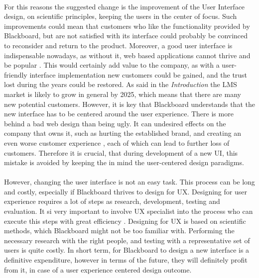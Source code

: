 \documentclass[]{article}
\begin{document}
\paragraph{}
For this reasons the suggested change is the improvement of the User Interface design, on scientific principles, keeping the users in the center of focus. Such improvements could mean that customers who like the functionality provided by Blackboard, but are not satisfied with its interface could probably be convinced to reconsider and return to the product. Moreover, a good user interface is indispensable nowadays, as without it, web based applications cannot thrive and be popular \cite{UI-Advantages}. This would certainly add value to the company, as with a user-friendly interface implementation new customers could be gained, and the trust lost during the years could be restored. As said in the \textit{Introduction} the LMS market is likely to grow in general by 2025, which means that there are many new potential customers. However, it is key that Blackboard understands that the new interface has to be centered around the user experience. There is more behind a bad web design than being ugly. It can undesired effects on the company that owns it, such as hurting the established brand, and creating an even worse customer experience \cite{bad-design-why}, each of which can lead to further loss of customers. Therefore it is crucial, that during development of a new UI, this mistake is avoided by keeping the in mind the user-centered design paradigms. 


\paragraph{}
However, changing the user interface is not an easy task. This process can be long and costly, especially if Blackboard thrives to design for UX. Designing for user experience requires a lot of steps as research, development, testing and evaluation. It si very important to involve UX specialist into the process who can execute this steps with great efficiency \cite{UX-30000}. Designing for UX is based on scientific methods, which Blackboard might not be too familiar with. Performing the necessary research with the right people, and testing with a representative set of users is quite costly. In short term, for Blackboard to design a new interface is a definitive expenditure, however in terms of the future, they will definitely profit from it, in case of a user experience centered design outcome. 
\end{document}
